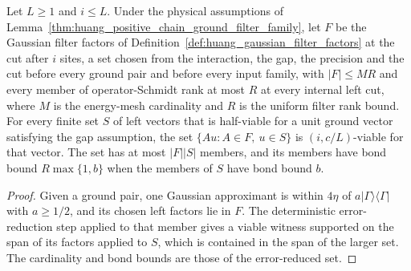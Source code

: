 \begin{lemma}
    \label{thm:huang_positive_chain_error_reduction_factors}
    \leanok
    Let $L\ge1$ and $i\le L$. Under the physical assumptions of
    Lemma~\ref{thm:huang_positive_chain_ground_filter_family}, let $F$ be
    the Gaussian filter factors of
    Definition~\ref{def:huang_gaussian_filter_factors} at the cut after $i$
    sites, a set chosen from the interaction, the gap, the precision and the
    cut before every ground pair and before every input family, with
    $|F|\le MR$ and every member of operator-Schmidt rank at most $R$ at
    every internal left cut, where $M$ is the energy-mesh cardinality and $R$
    is the uniform filter rank bound. For every finite set $S$ of left vectors that is half-viable for
    a unit ground vector satisfying the gap assumption, the set
    $\{Au : A\in F,\ u\in S\}$ is $(i,c/L)$-viable for that vector. The
    set has at most $|F||S|$ members, and its members have bond bound
    $R\max\{1,b\}$ when the members of $S$ have bond bound $b$.
\end{lemma}
\begin{proof}
    \leanok
    Given a ground pair, one Gaussian approximant is within $4\eta$ of
    $a|\Gamma\rangle\langle\Gamma|$ with $a\ge1/2$, and its chosen left
    factors lie in $F$. The deterministic error-reduction step applied to that
    member gives a viable witness supported on the span of its factors
    applied to $S$, which is contained in the span of the larger set. The
    cardinality and bond bounds are those of the error-reduced set.
\end{proof}

